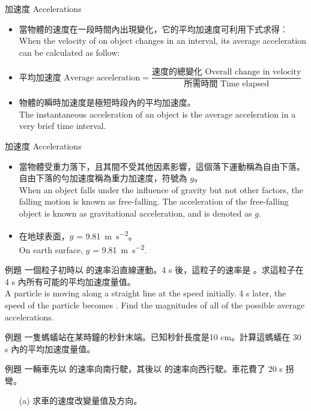 \documentclass[beamer=true]{standalone}
\begin{document}
\begin{frame}{加速度 Accelerations}
    \begin{itemize}
        \item 當物體的速度在一段時間內出現變化，它的平均加速度可利用下式求得︰\\When the velocity of on object changes in an interval, its average acceleration can be calculated as follow:
        \item $\textrm{平均加速度 Average acceleration}=\dfrac{\textrm{速度的總變化 Overall change in velocity}}{\textrm{所需時間 Time elapsed}}$
        \item 物體的瞬時加速度是極短時段內的平均加速度。 \\The instantaneous acceleration of an object is the average acceleration in a very brief time interval.
    \end{itemize}
\end{frame}
\begin{frame}{加速度 Accelerations}
    \begin{itemize}
        \item 當物體受重力落下，且其間不受其他因素影響，這個落下運動稱為自由下落。自由下落的勻加速度稱為重力加速度，符號為 $\mathit{g}$。 \\When an object falls under the influence of gravity but not other factors, the falling motion is known as free-falling. The acceleration of the free-falling object is known as gravitational acceleration, and is denoted as $\mathit{g}$.
        \item 在地球表面，$\mathit{g}$ = \qty{9.81}{m.s^{-2}}。 \\On earth surface, $\mathit{g}$ = \qty{9.81}{m.s^{-2}}.
    \end{itemize}
\end{frame}
\begin{frame}[t]{例題}
    一個粒子初時以  的速率沿直線運動。4 s 後，這粒子的速率是 。求這粒子在 4 s 內所有可能的平均加速度量值。 \\A particle is moving along a straight line at the speed  initially. 4 s later, the speed of the particle becomes . Find the magnitudes of all of the possible average accelerations.
\end{frame}
\begin{frame}[t]{例題}
    一隻螞蟻站在某時鐘的秒針末端。已知秒針長度是10 cm。計算這螞蟻在 30 s 內的平均加速度量值。
\end{frame}
\begin{frame}[t]{例題}
    一輛車先以  的速率向南行駛，其後以  的速率向西行駛。車花費了 20 s 拐彎。
    \begin{itemize}
        \item [(a)]求車的速度改變量值及方向。
    \end{itemize}
\end{frame}
\end{document}

